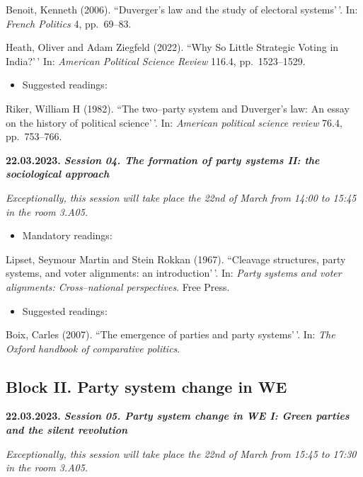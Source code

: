 \documentclass[
  12pt,
]{article}
\providecommand{\tightlist}{%
  \setlength{\itemsep}{0pt}\setlength{\parskip}{0pt}}
\begin{document}
Benoit, Kenneth (2006). ``Duverger's law and the study of electoral
systems'\,'. In: \emph{French Politics} 4, pp.~69--83.

Heath, Oliver and Adam Ziegfeld (2022). ``Why So Little Strategic Voting
in India?'\,' In: \emph{American Political Science Review} 116.4,
pp.~1523--1529.

\begin{itemize}
\tightlist
\item
  Suggested readings:
\end{itemize}

Riker, William H (1982). ``The two--party system and Duverger's law: An
essay on the history of political science'\,'. In:
\emph{American political science review} 76.4, pp.~753--766.

\textbf{22.03.2023.} \textbf{\emph{Session 04. The formation of party
systems II: the sociological approach}}

\emph{Exceptionally, this session will take place the 22nd of March from
14:00 to 15:45 in the room 3.A05.}

\begin{itemize}
\tightlist
\item
  Mandatory readings:
\end{itemize}

Lipset, Seymour Martin and Stein Rokkan (1967). ``Cleavage structures,
party systems, and voter alignments: an introduction'\,'. In:
\emph{Party systems and voter alignments: Cross--national perspectives}.
Free Press.

\begin{itemize}
\tightlist
\item
  Suggested readings:
\end{itemize}

Boix, Carles (2007). ``The emergence of parties and party systems'\,'.
In: \emph{The Oxford handbook of comparative politics}.

\hypertarget{block-ii.-party-system-change-in-we}{%
\subsection{Block II. Party system change in
WE}\label{block-ii.-party-system-change-in-we}}

\textbf{22.03.2023.} \textbf{\emph{Session 05. Party system change in WE
I: Green parties and the silent revolution}}

\emph{Exceptionally, this session will take place the 22nd of March from
15:45 to 17:30 in the room 3.A05.}
\end{document}
